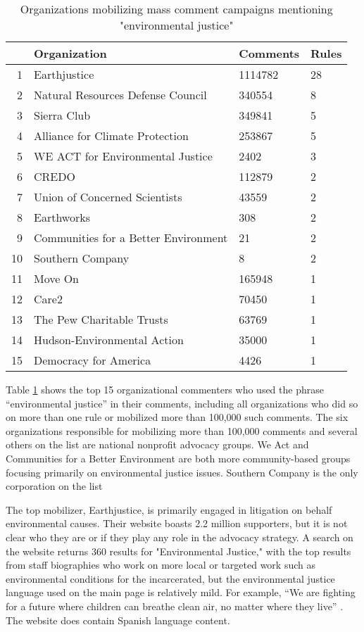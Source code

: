 \begin{table}[!h] 
  \caption{Organizations mobilizing mass comment campaigns mentioning "environmental justice"}
\centering
\begin{tabular}{rlll}
  \hline
 & Organization & Comments & Rules \\ 
  \hline
1 & Earthjustice & 1114782 & 28 \\ 
  2 & Natural Resources Defense Council &  340554 &  8 \\ 
  3 & Sierra Club &  349841 &  5 \\ 
  4 & Alliance for Climate Protection &  253867 &  5 \\ 
  5 & WE ACT for Environmental Justice &    2402 &  3 \\ 
  6 & CREDO &  112879 &  2 \\ 
  7 & Union of Concerned Scientists &   43559 &  2 \\ 
  8 & Earthworks &     308 &  2 \\ 
  9 & Communities for a Better Environment &      21 &  2 \\ 
  10 & Southern Company &       8 &  2 \\ 
  11 & Move On &  165948 &  1 \\ 
  12 & Care2 &   70450 &  1 \\ 
  13 & The Pew Charitable Trusts &   63769 &  1 \\ 
  14 & Hudson-Environmental Action &   35000 &  1 \\ 
  15 & Democracy for America &    4426 &  1 \\ 
  \end{tabular}
  \label{tab:orgs}
\end{table}

Table \ref{tab:orgs} shows the top 15 organizational commenters who used the phrase ``environmental justice'' in their comments, including all organizations who did so on more than one rule or mobilized more than 100,000 such comments. The six organizations responsible for mobilizing more than 100,000 comments and several others on the list are national nonprofit advocacy groups.  We Act and Communities for a Better Environment are both more community-based groups focusing primarily on environmental justice issues. Southern Company is the only corporation on the list
 
 The top mobilizer, Earthjustice, is primarily engaged in litigation on behalf environmental causes. Their website boasts 2.2 million supporters,  but it is not clear who they are or if they play any role in the advocacy strategy. A search on the website returns 360 results for "Environmental Justice," with the top results from staff biographies who work on more local or targeted work such as environmental conditions for the incarcerated, but the environmental justice language used on the main page is relatively mild. For example, ``We are fighting for a future where children can breathe clean air, no matter where they live'' \citep{Earthjustice2017}. The website does contain Spanish language content. 
 
